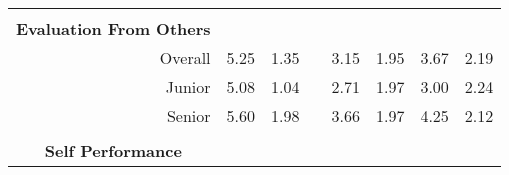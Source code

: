 \begin{table}[]
\begin{tabular}{@{}rcclcccc@{}}
\multicolumn{1}{l}{}                                & \multicolumn{1}{l}{}                          & \multicolumn{1}{l}{}                       &  & \multicolumn{1}{l}{}                           & \multicolumn{1}{l}{}                        & \multicolumn{1}{l}{}                          & \multicolumn{1}{l}{}                        \\
\multicolumn{1}{l}{\textbf{Evaluation From Others}} & \multicolumn{1}{l}{}                          & \multicolumn{1}{l}{}                       &  & \multicolumn{1}{l}{}                           & \multicolumn{1}{l}{}                        & \multicolumn{1}{l}{}                          & \multicolumn{1}{l}{}                        \\
Overall                                             & 5.25                                          & 1.35                                   &  & 3.15                                           & 1.95                                        & 3.67                                          & 2.19                                        \\
Junior                                              & 5.08                                          & 1.04                                       &  & 2.71                                           & 1.97                                        & 3.00                                             & 2.24                                        \\
Senior                                              & 5.60                                           & 1.98                                       &  & 3.66                                           & 1.97                                        & 4.25                                          & 2.12                                        \\
\multicolumn{1}{l}{}                                & \multicolumn{1}{l}{}                          & \multicolumn{1}{l}{}                       &  & \multicolumn{1}{l}{}                           & \multicolumn{1}{l}{}                        & \multicolumn{1}{l}{}                          & \multicolumn{1}{l}{}                        \\
\multicolumn{1}{c}{\textbf{Self Performance}}       & \multicolumn{1}{l}{}                          & \multicolumn{1}{l}{}                       &  & \multicolumn{1}{l}{}                           & \multicolumn{1}{l}{}                        & \multicolumn{1}{l}{}                          & \multicolumn{1}{l}{}                        \\

\end{tabular}
\end{table}
